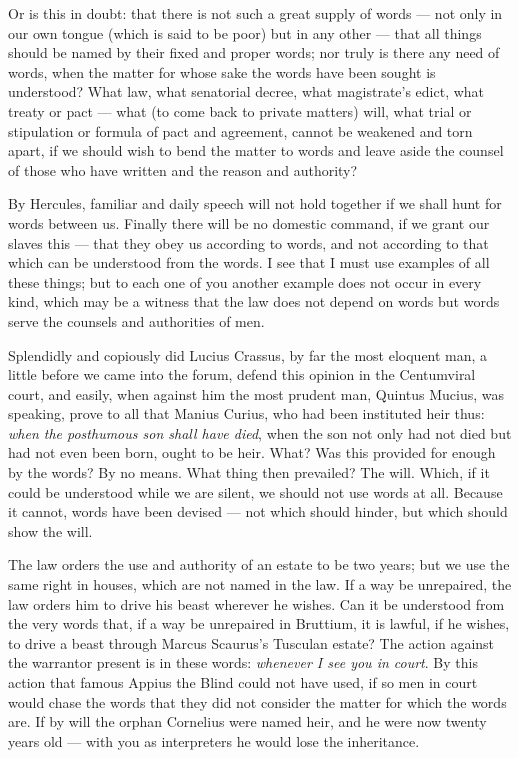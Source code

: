  Or is this in doubt: that there is not such a great supply of words --- not only in our own tongue (which is said to be poor) but in any other --- that all things should be named by their fixed and proper words; nor truly is there any need of words, when the matter for whose sake the words have been sought is understood? What law, what senatorial decree, what magistrate's edict, what treaty or pact --- what (to come back to private matters) will, what trial or stipulation or formula of pact and agreement, cannot be weakened and torn apart, if we should wish to bend the matter to words and leave aside the counsel of those who have written and the reason and authority?

 By Hercules, familiar and daily speech will not hold together if we shall hunt for words between us. Finally there will be no domestic command, if we grant our slaves this --- that they obey us according to words, and not according to that which can be understood from the words. I see that I must use examples of all these things; but to each one of you another example does not occur in every kind, which may be a witness that the law does not depend on words but words serve the counsels and authorities of men.

 Splendidly and copiously did Lucius Crassus, by far the most eloquent man, a little before we came into the forum, defend this opinion in the Centumviral court, and easily, when against him the most prudent man, Quintus Mucius, was speaking, prove to all that Manius Curius, who had been instituted heir thus: \textit{when the posthumous son shall have died}, when the son not only had not died but had not even been born, ought to be heir. What? Was this provided for enough by the words? By no means. What thing then prevailed? The will. Which, if it could be understood while we are silent, we should not use words at all. Because it cannot, words have been devised --- not which should hinder, but which should show the will.

 The law orders the use and authority of an estate to be two years; but we use the same right in houses, which are not named in the law. If a way be unrepaired, the law orders him to drive his beast wherever he wishes. Can it be understood from the very words that, if a way be unrepaired in Bruttium, it is lawful, if he wishes, to drive a beast through Marcus Scaurus's Tusculan estate? The action against the warrantor present is in these words: \textit{whenever I see you in court}. By this action that famous Appius the Blind could not have used, if so men in court would chase the words that they did not consider the matter for which the words are. If by will the orphan Cornelius were named heir, and he were now twenty years old --- with you as interpreters he would lose the inheritance.

